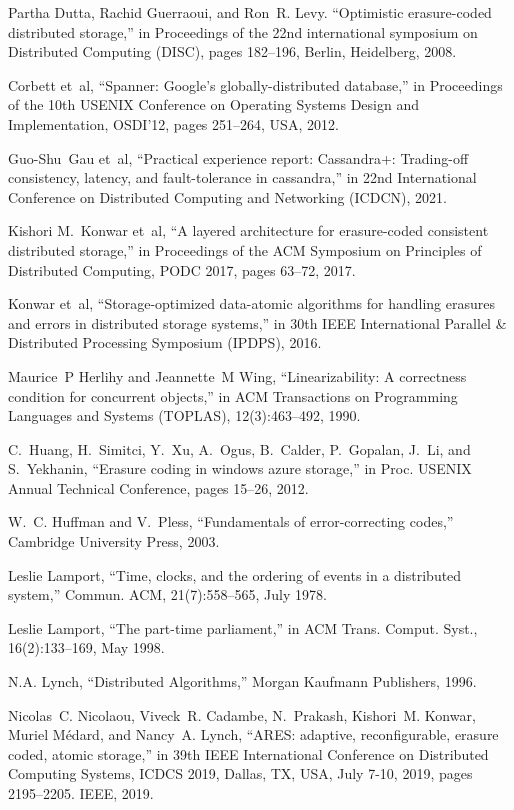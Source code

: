 \begin{thebibliography}{00}
Partha Dutta, Rachid Guerraoui, and Ron~R. Levy.
``Optimistic erasure-coded distributed storage,''
in Proceedings of the 22nd international symposium on
  Distributed Computing (DISC), pages 182--196, Berlin, Heidelberg, 2008.

Corbett et~al, ``Spanner: Google's globally-distributed database,''
in Proceedings of the 10th USENIX Conference on Operating
  Systems Design and Implementation, OSDI'12, pages 251--264, 
  USA, 2012.

Guo-Shu~Gau et~al,
``Practical experience report: Cassandra+: Trading-off consistency,
  latency, and fault-tolerance in cassandra,''
in 22nd International Conference on Distributed Computing and
  Networking (ICDCN),   2021.

Kishori M.~Konwar et~al,
``A layered architecture for erasure-coded consistent distributed
  storage,''
in Proceedings of the {ACM} Symposium on Principles of
  Distributed Computing, {PODC} 2017, 
  pages 63--72, 2017.

Konwar et~al,
``Storage-optimized data-atomic algorithms for handling erasures and
  errors in distributed storage systems,''
in 30th IEEE International Parallel \& Distributed Processing
  Symposium (IPDPS), 2016.

Maurice~P Herlihy and Jeannette~M Wing,
``Linearizability: A correctness condition for concurrent objects,''
in ACM Transactions on Programming Languages and Systems (TOPLAS),
  12(3):463--492, 1990.

C.~Huang, H.~Simitci, Y.~Xu, A.~Ogus, B.~Calder, P.~Gopalan, J.~Li, and
  S.~Yekhanin,
``Erasure coding in windows azure storage,''
in Proc. USENIX Annual Technical Conference, pages 15--26,
  2012.

W.~C. Huffman and V.~Pless,
``Fundamentals of error-correcting codes,''
Cambridge University Press, 2003.

Leslie Lamport,
``Time, clocks, and the ordering of events in a distributed system,''
Commun. ACM, 21(7):558--565, July 1978.

Leslie Lamport,
``The part-time parliament,''
in ACM Trans. Comput. Syst., 16(2):133--169, May 1998.

N.A. Lynch,
``Distributed Algorithms,''
Morgan Kaufmann Publishers, 1996.

Nicolas~C. Nicolaou, Viveck~R. Cadambe, N.~Prakash, Kishori~M. Konwar, Muriel
  M{\'{e}}dard, and Nancy~A. Lynch,
``ARES: adaptive, reconfigurable, erasure coded, atomic storage,''
in 39th {IEEE} International Conference on Distributed Computing
  Systems, {ICDCS} 2019, Dallas, TX, USA, July 7-10, 2019, pages 2195--2205.
  {IEEE}, 2019.


\end{thebibliography}
